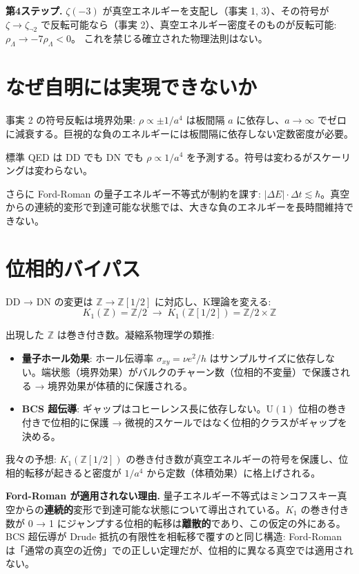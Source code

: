 \documentclass[11pt,a4paper]{article}
\begin{document}
\textbf{第4ステップ.}
$\zeta(-3)$ が真空エネルギーを支配し（事実 1, 3）、その符号が $\zeta \to \zeta_{\neg 2}$ で反転可能なら（事実 2）、真空エネルギー密度そのものが反転可能:
$\rho_\Lambda \to -7\rho_\Lambda < 0$。
これを禁じる確立された物理法則はない。

\section{なぜ自明には実現できないか}

事実 2 の符号反転は境界効果: $\rho \propto \pm 1/a^4$ は板間隔 $a$ に依存し、$a \to \infty$ でゼロに減衰する。巨視的な負のエネルギーには板間隔に依存しない定数密度が必要。

標準 QED は DD でも DN でも $\rho \propto 1/a^4$ を予測する。符号は変わるがスケーリングは変わらない。

さらに Ford-Roman の量子エネルギー不等式が制約を課す: $|\Delta E| \cdot \Delta t \lesssim \hbar$。真空からの連続的変形で到達可能な状態では、大きな負のエネルギーを長時間維持できない。

\section{位相的バイパス}

DD → DN の変更は $\mathbb{Z} \to \mathbb{Z}[1/2]$ に対応し、K理論を変える:
$$K_1(\mathbb{Z}) = \mathbb{Z}/2 \;\longrightarrow\; K_1(\mathbb{Z}[1/2]) = \mathbb{Z}/2 \times \mathbb{Z}$$

出現した $\mathbb{Z}$ は巻き付き数。凝縮系物理学の類推:

\begin{itemize}
\item \textbf{量子ホール効果}: ホール伝導率 $\sigma_{xy} = \nu e^2/h$ はサンプルサイズに依存しない。端状態（境界効果）がバルクのチャーン数（位相的不変量）で保護される → 境界効果が体積的に保護される。

\item \textbf{BCS 超伝導}: ギャップはコヒーレンス長に依存しない。$\mathrm{U}(1)$ 位相の巻き付きで位相的に保護 → 微視的スケールではなく位相的クラスがギャップを決める。
\end{itemize}

我々の予想: $K_1(\mathbb{Z}[1/2])$ の巻き付き数が真空エネルギーの符号を保護し、位相的転移が起きると密度が $1/a^4$ から定数（体積効果）に格上げされる。

\textbf{Ford-Roman が適用されない理由.}
量子エネルギー不等式はミンコフスキー真空からの\textbf{連続的}変形で到達可能な状態について導出されている。$K_1$ の巻き付き数が 0 → 1 にジャンプする位相的転移は\textbf{離散的}であり、この仮定の外にある。
BCS 超伝導が Drude 抵抗の有限性を相転移で覆すのと同じ構造: Ford-Roman は「通常の真空の近傍」での正しい定理だが、位相的に異なる真空では適用されない。
\end{document}
